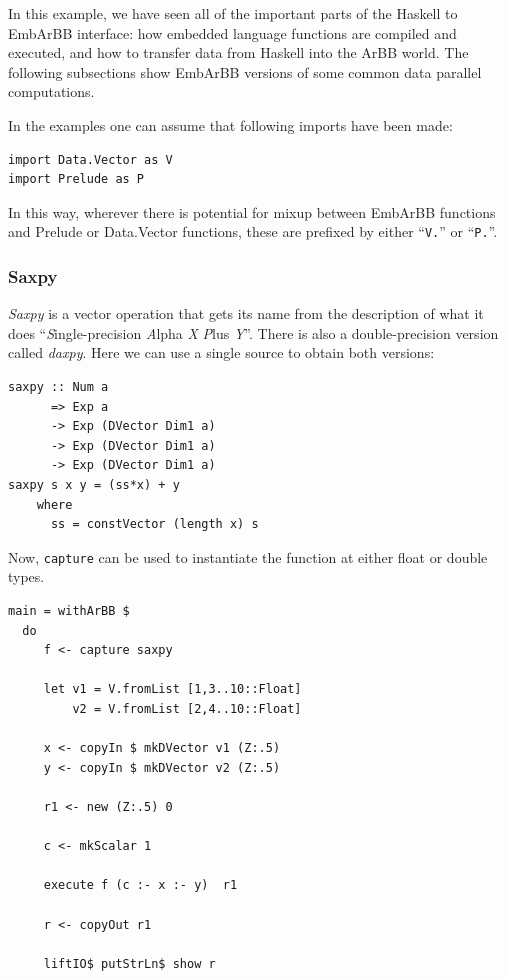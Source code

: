 In this example, we have seen all of the important parts of the
Haskell to EmbArBB interface: how embedded language functions are compiled and
executed, and how to transfer data from Haskell into the ArBB world.
The following subsections show EmbArBB versions of some common 
data parallel computations.



In the examples one can assume that following imports have been made: 
\begin{verbatim}
import Data.Vector as V
import Prelude as P
\end{verbatim}
In this way, wherever there is potential for mixup between EmbArBB functions 
and Prelude or Data.Vector functions, these are prefixed by either ``{\tt V.}'' or 
``{\tt P.}''. 

\FloatBarrier 
\subsubsection{Saxpy} 
{\em Saxpy} is a vector operation that gets its name from the 
description of what it does ``{\em S}ingle-precision {\em A}lpha {\em X} {\em P}lus {\em Y}''. 
There is also a double-precision version called {\em daxpy}. Here we can use a single source 
to obtain both versions:

\begin{Verbatim}[samepage=true]
saxpy :: Num a 
      => Exp a 
      -> Exp (DVector Dim1 a) 
      -> Exp (DVector Dim1 a) 
      -> Exp (DVector Dim1 a) 
saxpy s x y = (ss*x) + y 
    where 
      ss = constVector (length x) s
\end{Verbatim}

Now, {\tt capture} can be used to instantiate the function at either float or double 
types.  

\begin{Verbatim}[samepage=true]
main = withArBB $ 
  do 
     f <- capture saxpy
     
     let v1 = V.fromList [1,3..10::Float] 
         v2 = V.fromList [2,4..10::Float] 
          
     x <- copyIn $ mkDVector v1 (Z:.5) 
     y <- copyIn $ mkDVector v2 (Z:.5) 
     
     r1 <- new (Z:.5) 0    
           
     c <- mkScalar 1 
     
     execute f (c :- x :- y)  r1
              
     r <- copyOut r1
              
     liftIO$ putStrLn$ show r
\end{Verbatim} 

